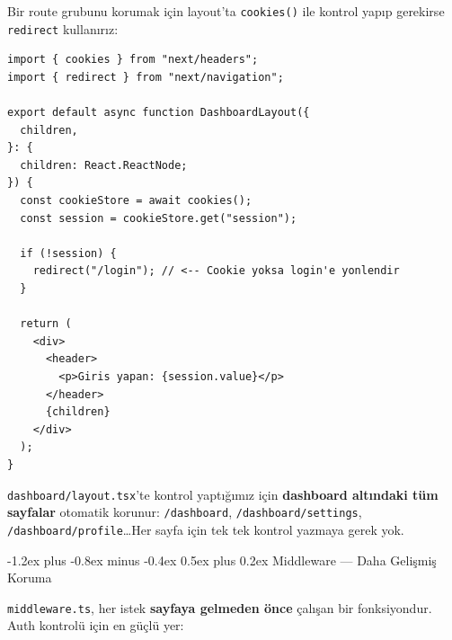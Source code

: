 \documentclass[12pt, a4paper]{article}
\makeatletter
\renewcommand{\subsection}{%
  \@startsection{subsection}{2}{\z@}%
    {-1.2ex plus -0.8ex minus -0.4ex}%
    {0.5ex plus 0.2ex}%
    {\normalfont\large\bfseries\sffamily\color{secondary}}%
}
\makeatother
\begin{document}
Bir route grubunu korumak için layout'ta \texttt{cookies()} ile kontrol
yapıp gerekirse \texttt{redirect} kullanırız:

\vspace{6pt}

\begin{tcolorbox}[enhanced, colback=codebg, colframe=gray!30,
    colbacktitle=authcol!85!black, coltitle=white, arc=4pt,
    title={\sffamily\bfseries\small src/app/dashboard/layout.tsx}]
\begin{lstlisting}[style=jsxstyle]
import { cookies } from "next/headers";
import { redirect } from "next/navigation";

export default async function DashboardLayout({
  children,
}: {
  children: React.ReactNode;
}) {
  const cookieStore = await cookies();
  const session = cookieStore.get("session");

  if (!session) {
    redirect("/login"); // <-- Cookie yoksa login'e yonlendir
  }

  return (
    <div>
      <header>
        <p>Giris yapan: {session.value}</p>
      </header>
      {children}
    </div>
  );
}
\end{lstlisting}
\end{tcolorbox}

\vspace{6pt}

\begin{infobox}
\texttt{dashboard/layout.tsx}'te kontrol yaptığımız için
\textbf{dashboard altındaki tüm sayfalar} otomatik korunur:
\texttt{/dashboard}, \texttt{/dashboard/settings},
\texttt{/dashboard/profile}\ldots Her sayfa için tek tek kontrol
yazmaya gerek yok.
\end{infobox}

\newpage
\subsection{Middleware --- Daha Gelişmiş Koruma}

\texttt{middleware.ts}, her istek \textbf{sayfaya gelmeden önce} çalışan
bir fonksiyondur. Auth kontrolü için en güçlü yer:

\vspace{6pt}
\end{document}
